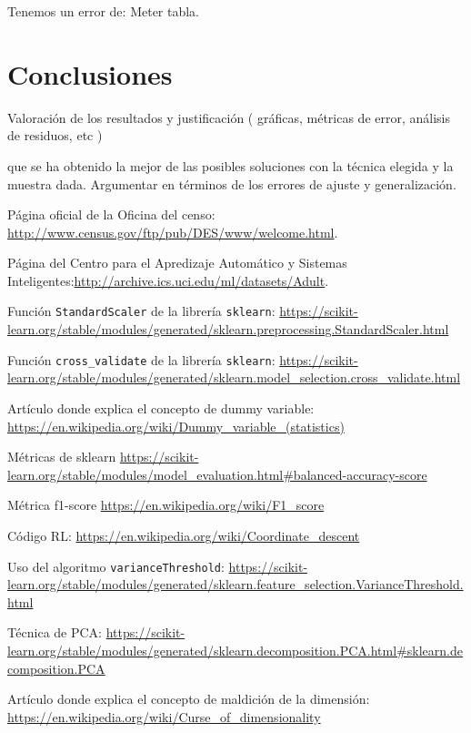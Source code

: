 \documentclass[11pt,a4paper]{article}
\begin{document}
Tenemos un error de: Meter tabla.


\section{ Conclusiones }
Valoración de los resultados y justificación
( gráficas, métricas de error, análisis de residuos, etc )


que se ha obtenido la mejor de las posibles soluciones con la técnica elegida y la muestra dada. Argumentar en términos de los errores de ajuste y generalización. 


\newpage
\begin{thebibliography}{9}
Página oficial de la Oficina del censo: \url{http://www.census.gov/ftp/pub/DES/www/welcome.html}.

Página del Centro para el Apredizaje Automático y Sistemas Inteligentes:\url{http://archive.ics.uci.edu/ml/datasets/Adult}.

Función \texttt{StandardScaler} de la librería \texttt{sklearn}: \url{https://scikit-learn.org/stable/modules/generated/sklearn.preprocessing.StandardScaler.html}

Función \texttt{cross\_validate} de la librería \texttt{sklearn}:
\url{https://scikit-learn.org/stable/modules/generated/sklearn.model_selection.cross_validate.html}

Artículo donde explica el concepto de dummy variable: \url{https://en.wikipedia.org/wiki/Dummy_variable_(statistics)}

Métricas de sklearn \url{https://scikit-learn.org/stable/modules/model_evaluation.html#balanced-accuracy-score}


Métrica f1-score \url{https://en.wikipedia.org/wiki/F1_score}


Código RL: \url{https://en.wikipedia.org/wiki/Coordinate_descent}


Uso del algoritmo \texttt{varianceThreshold}: \url{https://scikit-learn.org/stable/modules/generated/sklearn.feature_selection.VarianceThreshold.html}

Técnica de PCA: 
\url{https://scikit-learn.org/stable/modules/generated/sklearn.decomposition.PCA.html#sklearn.decomposition.PCA}

Artículo donde explica el concepto de maldición de la dimensión: \url{https://en.wikipedia.org/wiki/Curse_of_dimensionality}


\end{thebibliography}
\end{document}
